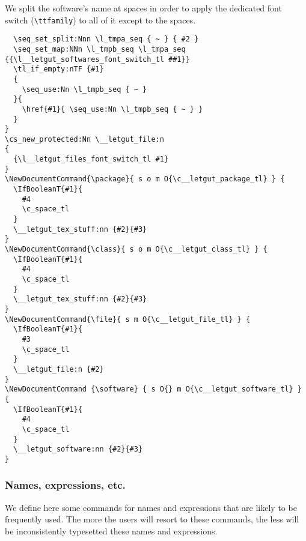 \documentclass{letgut}
\begin{document}
We split the software's name at spaces in order to apply the dedicated
font switch (\lstinline+\ttfamily+) to all of it except to the spaces.

\begin{lstlisting}
  \seq_set_split:Nnn \l_tmpa_seq { ~ } { #2 }
  \seq_set_map:NNn \l_tmpb_seq \l_tmpa_seq {{\l__letgut_softwares_font_switch_tl ##1}}
  \tl_if_empty:nTF {#1}
  {
    \seq_use:Nn \l_tmpb_seq { ~ }
  }{
    \href{#1}{ \seq_use:Nn \l_tmpb_seq { ~ } }
  }
}
\cs_new_protected:Nn \__letgut_file:n
{
  {\l__letgut_files_font_switch_tl #1}
}
\NewDocumentCommand{\package}{ s o m O{\c__letgut_package_tl} } {
  \IfBooleanT{#1}{
    #4
    \c_space_tl
  }
  \__letgut_tex_stuff:nn {#2}{#3}
}
\NewDocumentCommand{\class}{ s o m O{\c__letgut_class_tl} } {
  \IfBooleanT{#1}{
    #4
    \c_space_tl
  }
  \__letgut_tex_stuff:nn {#2}{#3}
}
\NewDocumentCommand{\file}{ s m O{\c__letgut_file_tl} } {
  \IfBooleanT{#1}{
    #3
    \c_space_tl
  }
  \__letgut_file:n {#2}
}
\NewDocumentCommand {\software} { s O{} m O{\c__letgut_software_tl} } {
  \IfBooleanT{#1}{
    #4
    \c_space_tl
  }
  \__letgut_software:nn {#2}{#3}
}
\end{lstlisting}

\subsubsection{Names, expressions, etc.}
\label{ImplementationDocumentcommandsNamesexpressionsetc-11vg55h0jlj0}
We define here some commands for names and expressions that are likely to be
frequently used. The more the users will resort to these commands, the less
will be inconsistently typesetted these names and expressions.
\end{document}
